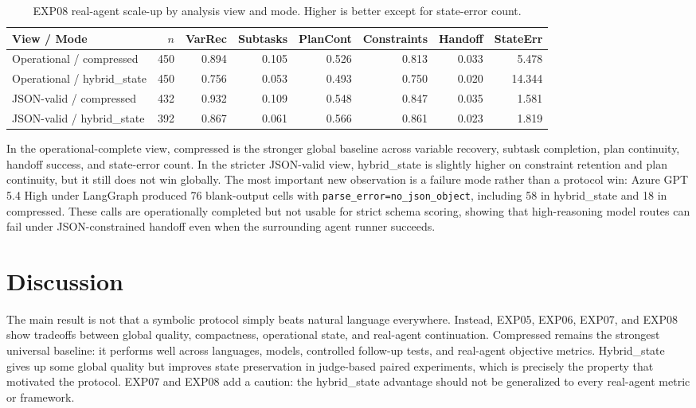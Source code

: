 \documentclass[11pt]{article}
\begin{document}
\begin{table}[ht]
\centering
\small
\begin{tabular}{lrrrrrrr}
\toprule
View / Mode & $n$ & VarRec & Subtasks & PlanCont & Constraints & Handoff & StateErr \\
\midrule
Operational / compressed & 450 & 0.894 & 0.105 & 0.526 & 0.813 & 0.033 & 5.478 \\
Operational / hybrid\_state & 450 & 0.756 & 0.053 & 0.493 & 0.750 & 0.020 & 14.344 \\
JSON-valid / compressed & 432 & 0.932 & 0.109 & 0.548 & 0.847 & 0.035 & 1.581 \\
JSON-valid / hybrid\_state & 392 & 0.867 & 0.061 & 0.566 & 0.861 & 0.023 & 1.819 \\
\bottomrule
\end{tabular}
\caption{EXP08 real-agent scale-up by analysis view and mode. Higher is better except for state-error count.}
\label{tab:exp08_modes}
\end{table}

In the operational-complete view, compressed is the stronger global baseline across variable recovery, subtask completion, plan continuity, handoff success, and state-error count. In the stricter JSON-valid view, hybrid\_state is slightly higher on constraint retention and plan continuity, but it still does not win globally. The most important new observation is a failure mode rather than a protocol win: Azure GPT 5.4 High under LangGraph produced 76 blank-output cells with \texttt{parse\_error=no\_json\_object}, including 58 in hybrid\_state and 18 in compressed. These calls are operationally completed but not usable for strict schema scoring, showing that high-reasoning model routes can fail under JSON-constrained handoff even when the surrounding agent runner succeeds.

\section{Discussion}
The main result is not that a symbolic protocol simply beats natural language everywhere. Instead, EXP05, EXP06, EXP07, and EXP08 show tradeoffs between global quality, compactness, operational state, and real-agent continuation. Compressed remains the strongest universal baseline: it performs well across languages, models, controlled follow-up tests, and real-agent objective metrics. Hybrid\_state gives up some global quality but improves state preservation in judge-based paired experiments, which is precisely the property that motivated the protocol. EXP07 and EXP08 add a caution: the hybrid\_state advantage should not be generalized to every real-agent metric or framework.
\end{document}
